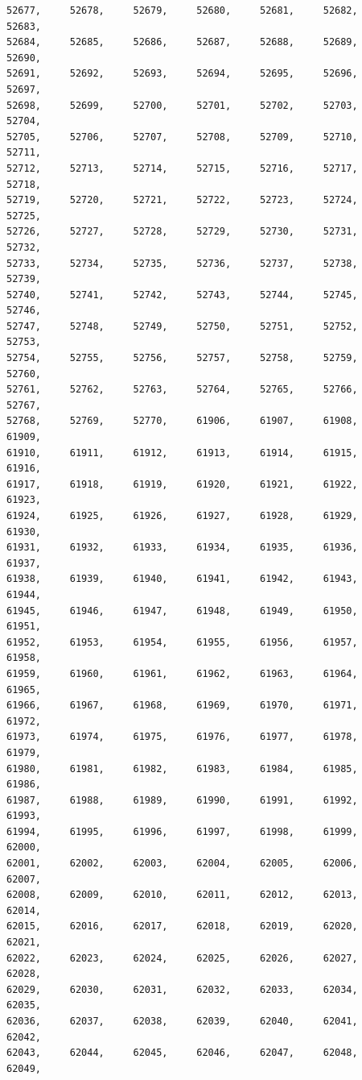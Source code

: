 \documentclass[a4paper,11pt]{report}
\begin{document}
\begin{verbatim}
52677,     52678,     52679,     52680,     52681,     52682,     52683,     
52684,     52685,     52686,     52687,     52688,     52689,     52690,     
52691,     52692,     52693,     52694,     52695,     52696,     52697,     
52698,     52699,     52700,     52701,     52702,     52703,     52704,     
52705,     52706,     52707,     52708,     52709,     52710,     52711,     
52712,     52713,     52714,     52715,     52716,     52717,     52718,     
52719,     52720,     52721,     52722,     52723,     52724,     52725,     
52726,     52727,     52728,     52729,     52730,     52731,     52732,     
52733,     52734,     52735,     52736,     52737,     52738,     52739,     
52740,     52741,     52742,     52743,     52744,     52745,     52746,     
52747,     52748,     52749,     52750,     52751,     52752,     52753,     
52754,     52755,     52756,     52757,     52758,     52759,     52760,     
52761,     52762,     52763,     52764,     52765,     52766,     52767,     
52768,     52769,     52770,     61906,     61907,     61908,     61909,     
61910,     61911,     61912,     61913,     61914,     61915,     61916,     
61917,     61918,     61919,     61920,     61921,     61922,     61923,     
61924,     61925,     61926,     61927,     61928,     61929,     61930,     
61931,     61932,     61933,     61934,     61935,     61936,     61937,     
61938,     61939,     61940,     61941,     61942,     61943,     61944,     
61945,     61946,     61947,     61948,     61949,     61950,     61951,     
61952,     61953,     61954,     61955,     61956,     61957,     61958,     
61959,     61960,     61961,     61962,     61963,     61964,     61965,     
61966,     61967,     61968,     61969,     61970,     61971,     61972,     
61973,     61974,     61975,     61976,     61977,     61978,     61979,     
61980,     61981,     61982,     61983,     61984,     61985,     61986,     
61987,     61988,     61989,     61990,     61991,     61992,     61993,     
61994,     61995,     61996,     61997,     61998,     61999,     62000,     
62001,     62002,     62003,     62004,     62005,     62006,     62007,     
62008,     62009,     62010,     62011,     62012,     62013,     62014,     
62015,     62016,     62017,     62018,     62019,     62020,     62021,     
62022,     62023,     62024,     62025,     62026,     62027,     62028,     
62029,     62030,     62031,     62032,     62033,     62034,     62035,     
62036,     62037,     62038,     62039,     62040,     62041,     62042,     
62043,     62044,     62045,     62046,     62047,     62048,     62049,     

\end{verbatim}
\end{document}
